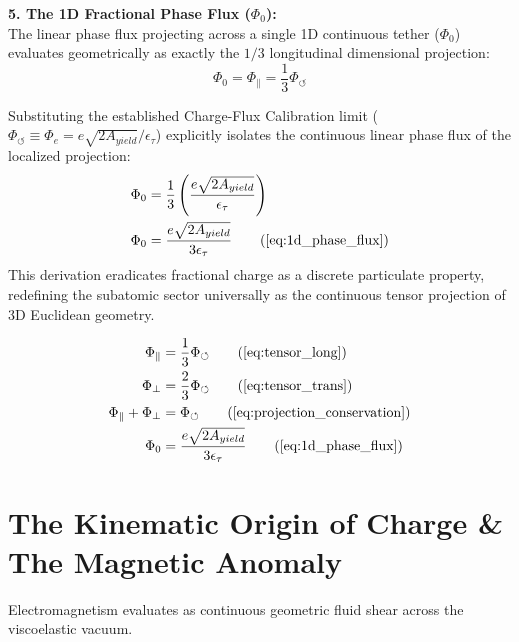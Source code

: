 \documentclass[11pt, a4paper]{article}
\begin{document}
\textbf{5. The 1D Fractional Phase Flux ($\Phi_0$):} \\
The linear phase flux projecting across a single 1D continuous tether ($\Phi_0$) evaluates geometrically as exactly the $1/3$ longitudinal dimensional projection:
\begin{equation}
    \Phi_0 = \Phi_{\parallel} = \frac{1}{3} \Phi_{\circlearrowleft} \nonumber
\end{equation}

Substituting the established Charge-Flux Calibration limit ($\Phi_{\circlearrowleft} \equiv \Phi_e = e\sqrt{2A_{yield}} / \epsilon_{\tau}$) explicitly isolates the continuous linear phase flux of the localized projection:
\begin{align}
    \Phi_0 &= \frac{1}{3} \left( \frac{e\sqrt{2A_{yield}}}{\epsilon_{\tau}} \right) \nonumber \\
    \Phi_0 &= \frac{e\sqrt{2A_{yield}}}{3\epsilon_{\tau}} \tag{\ref{eq:1d_phase_flux}}
\end{align}
This derivation eradicates fractional charge as a discrete particulate property, redefining the subatomic sector universally as the continuous tensor projection of 3D Euclidean geometry.

\begin{tcolorbox}[recallbox, title={\ref{box:tensor_projections}. 1D Fractional Phase Flux (Dimensional Projections)}]
\begin{align}
    \Phi_{\parallel} &= \frac{1}{3} \Phi_{\circlearrowleft} \tag{\ref{eq:tensor_long}} \\
    \Phi_{\perp} &= \frac{2}{3} \Phi_{\circlearrowleft} \tag{\ref{eq:tensor_trans}} \\
    \Phi_{\parallel} + \Phi_{\perp} &= \Phi_{\circlearrowleft} \tag{\ref{eq:projection_conservation}} \\
    \Phi_0 &= \frac{e\sqrt{2A_{yield}}}{3\epsilon_{\tau}} \tag{\ref{eq:1d_phase_flux}}
\end{align}
\end{tcolorbox}

\section{The Kinematic Origin of Charge \& The Magnetic Anomaly}
\label{sec:deriv_kinematic_charge}

Electromagnetism evaluates as continuous geometric fluid shear across the viscoelastic vacuum.
\end{document}
